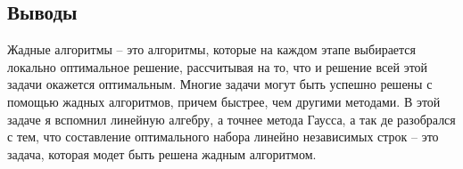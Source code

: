 \documentclass[12pt]{article}
\begin{document}
\subsection*{Выводы}

Жадные алгоритмы -- это алгоритмы, которые на каждом этапе выбирается локально оптимальное решение, рассчитывая на то, что и решение всей этой задачи окажется оптимальным. Многие задачи могут быть успешно решены с помощью жадных алгоритмов, причем быстрее, чем другими методами.\newline
В этой задаче я вспомнил линейную алгебру, а точнее метода Гаусса, а так де разобрался с тем, что составление оптимального набора линейно независимых строк -- это задача, которая модет быть решена жадным алгоритмом.
\end{document}
